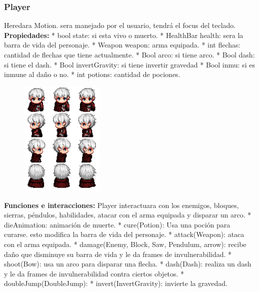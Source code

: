 \documentclass{article}
\begin{document}
\subsubsection*{Player}
Heredara Motion. sera manejado por el usuario, tendrá el focus del teclado. \newline
\subitem \textbf{Propiedades:} \newline
* bool state: si esta vivo o muerto.\newline
* HealthBar health: sera la barra de vida del personaje.\newline
* Weapon weapon: arma equipada.\newline
* int flechas: cantidad de flechas que tiene actualmente.\newline
* Bool arco: si tiene arco.\newline
* Bool dash: si tiene el dash.\newline
* Bool invertGravity: si tiene invertir gravedad\newline
* Bool inmu: si es inmune al daño o no.\newline
* int potions: cantidad de pociones.\newline

\begin{figure}[!ht]
	\includegraphics[width=4cm]{personaje.png}
	\centering
\end{figure}

\subitem \textbf{Funciones e interacciones:} \newline
Player interactuara con los enemigos, bloques, sierras, péndulos,  habilidades, atacar con el arma equipada y disparar un arco.
* dieAnimation: animación de muerte.\newline
* cure(Potion): Usa una poción para curarse. esto modifica la barra de vida del personaje.\newline
* attack(Weapon): ataca con el arma equipada.\newline
* damage(Enemy, Block, Saw, Pendulum, arrow): recibe daño que disminuye su barra de vida y le da frames de invulnerabilidad.\newline
* shoot(Bow): usa un arco para disparar una flecha.\newline
* dash(Dash): realiza un dash y le da frames de invulnerabilidad contra ciertos objetos.\newline
* doubleJump(DoubleJump):\newline
* invert(InvertGravity): invierte la gravedad.\newline
\end{document}
